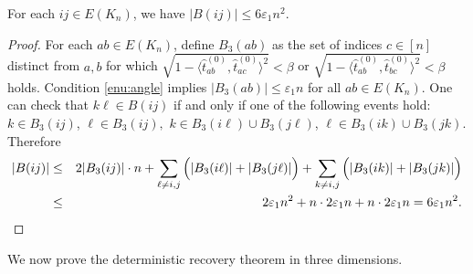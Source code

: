 \begin{lemma}
\label{lem:badK4}For each $ij\in E(K_{n})$, we have $|B(ij)|\le6\varepsilon_{1}n^{2}$.
\end{lemma}
\begin{proof}
For each $ab\in E(K_{n})$, define $B_{3}(ab)$ as the set of indices
$c\in[n]$ distinct from $a,b$ for which $\sqrt{1-\langle \hat{t}_{ab}^{(0)}, \hat{t}_{ac}^{(0)}\rangle^{2}}<\beta$
or $\sqrt{1-\langle\hat{t}_{ab}^{(0)},\hat{t}_{bc}^{(0)}\rangle^{2}}<\beta$
holds. Condition \ref{enu:angle} implies $|B_{3}(ab)|\le\varepsilon_{1}n$
for all $ab \in E(K_n)$. One can check that $k\ell\in B(ij)$ if and only if
one of the following events hold: $k\in B_{3}(ij)$, $\ell\in B_{3}(ij),$
$k\in B_{3}(i\ell)\cup B_{3}(j\ell)$, $\ell\in B_{3}(ik)\cup B_{3}(jk)$.
Therefore 
\begin{eqnarray*}
|B(ij)| & \le & 2|B_{3}(ij)|\cdot n+\sum_{\ell\neq i,j}\Big(|B_{3}(i\ell)|+|B_{3}(j\ell)|\Big)+\sum_{k\neq i,j}\Big(|B_{3}(ik)|+|B_{3}(jk)|\Big)\\
 & \le & 2\varepsilon_{1}n^{2}+n\cdot2\varepsilon_{1}n+n\cdot2\varepsilon_{1}n=6\varepsilon_{1}n^{2}.\qedhere
\end{eqnarray*}
\end{proof}


We now prove the deterministic recovery theorem in three dimensions.

